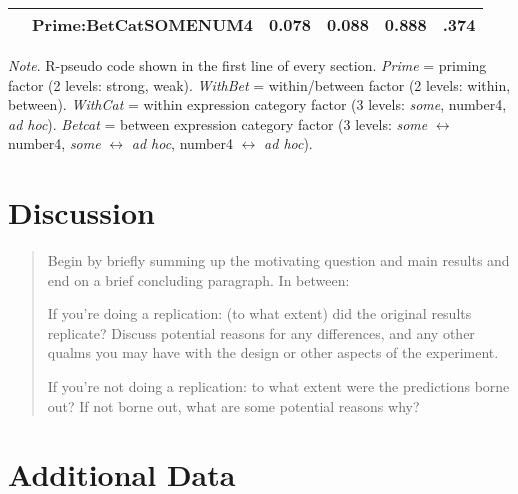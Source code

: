 \documentclass[10pt]{article}
\begin{document}
\begin{multicols}{2}
\begin{table*}[ht]
\begin{center}
\begin{tabular}{llrrrr}
      & Prime:BetCatSOMENUM4 & 0.078 & 0.088 & 0.888 & .374 \\
      \hline
    \end{tabular}
\end{center}
\emph{Note}. R-pseudo code shown in the first line of every section.
  \emph{Prime} = priming factor (2 levels: strong, weak).
  \emph{WithBet} = within/between factor (2 levels: within, between).
  \emph{WithCat} = within expression category factor (3 levels: \emph{some}, number4, \emph{ad hoc}).
  \emph{Betcat} = between expression category factor (3 levels: \emph{some} \(\leftrightarrow\) number4, \emph{some} \(\leftrightarrow\) \emph{ad hoc}, number4 \(\leftrightarrow\) \emph{ad hoc}).
\end{table*}


\section{Discussion}
\label{sec:discussion}

\begin{quote}
  Begin by briefly summing up the motivating question and main results and end on a brief concluding paragraph. In between:

  If you're doing a replication: (to what extent) did the original results replicate? Discuss potential reasons for any differences, and any other qualms you may have with the design or other aspects of the experiment.

  If you're not doing a replication: to what extent were the predictions borne out? If not borne out, what are some potential reasons why?
\end{quote}

\end{multicols}

\vfill
\printbibliography

\newpage
\appendix
\section{Additional Data}
\end{document}
